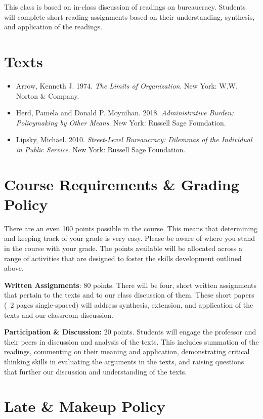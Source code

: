 \documentclass[a4paper,12pt]{article}
\begin{document}
This class is based on in-class discussion of readings on bureaucracy. Students will complete short reading assignments based on their understanding, synthesis, and application of the readings.

\section*{Texts}
\begin{itemize}
\item Arrow, Kenneth J. 1974. \emph{The Limits of Organization}. New York: W.W. Norton \& Company.
\item Herd, Pamela and Donald P. Moynihan. 2018. \emph{Administrative Burden: Policymaking by Other Means}. New York: Russell Sage Foundation.
\item Lipsky, Michael. 2010. \emph{Street-Level Bureaucracy: Dilemmas of the Individual in Public Service}. New York: Russell Sage Foundation.
\end{itemize}

\section*{Course Requirements \& Grading Policy}

There are an even 100 points possible in the course. This means that determining and keeping track of your grade is very easy. Please be aware of where you stand in the course with your grade. The points available will be allocated across a range of activities that are designed to foster the skills development outlined above.

\textbf{Written Assignments}: 80 points. There will be four, short written assignments that pertain to the texts and to our class discussion of them. These short papers (~2 pages single-spaced) will address synthesis, extension, and application of the texts and our classroom discussion.

\textbf{Participation \& Discussion: } 20 points. Students will engage the professor and their peers in discussion and analysis of the texts. This includes summation of the readings, commenting on their meaning and application, demonstrating critical thinking skills in evaluating the arguments in the texts, and raising questions that further our discussion and understanding of the texts.

\section*{Late \& Makeup Policy}
\end{document}

